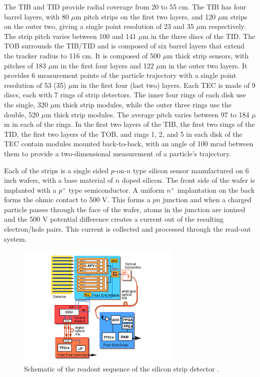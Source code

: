 \par The TIB and TID provide radial coverage from 20 to 55 cm.  The
TIB has four barrel layers, with 80 $\mu$m pitch strips on the first two
layers, and 120 $\mu$m strips on the outer two, giving a single point
resolution of 23 and 35 $\mu$m respectively.  The strip pitch varies
between 100 and 141 $\mu$m in the three discs of the TID.  The TOB
surrounds the TIB/TID and is composed of six barrel layers that extend
the tracker radius to 116 cm.  It is composed of 500 $\mu$m thick
strip sensors, with pitches of 183 $\mu$m in the first four layers and
122 $\mu$m in the outer two layers.  It provides 6 measurement points
of the particle trajectory with a single point resolution of 53 (35)
$\mu$m in the first four (last two) layers.  Each TEC is made of 9
discs, each with 7 rings of strip detectors.  The inner four rings of
each disk use the single, 320 $\mu$m thick strip modules, while the
outer three rings use the double, 520 $\mu$m thick strip modules.  The
average pitch varies between 97 to 184 $\mu$m in each of the rings.
In the first two layers of the TIB, the first two rings of the TID,
the first two layers of the TOB, and rings 1, 2, and 5 in each disk of
the TEC contain modules mounted back-to-back, with an angle of 100
mrad between them to provide a two-dimensional measurement of a
particle's trajectory.  

\par Each of the strips is a single sided $p$-on-$n$ type silicon
sensor manufactured on 6 inch wafers, with a base material of $n$
doped silicon.  The front side of the wafer is implanted with a
$p^{+}$ type semiconductor.  A uniform $n^{+}$ implantation on the
back forms the ohmic contact to 500 V.  This forms a $pn$ junction and
when a charged particle passes through the face of the wafer, atoms in
the junction are ionized and the 500 V potential difference creates a
current out of the resulting electron/hole pairs.  This current is
collected and processed through the read-out system.  

\begin{figure}[h]
   \centering
  \includegraphics[width=0.7\textwidth]{Figures/CMS_Diagrams/Tracker__Silicon_Strip_Readout.pdf}
  \caption{Schematic of the readout sequence of the silicon strip
    detector \cite{CMS:CMS_Machine_Chatrchyan:2008aa}.} \label{fig:tracker_strip_readout}
\end{figure}

